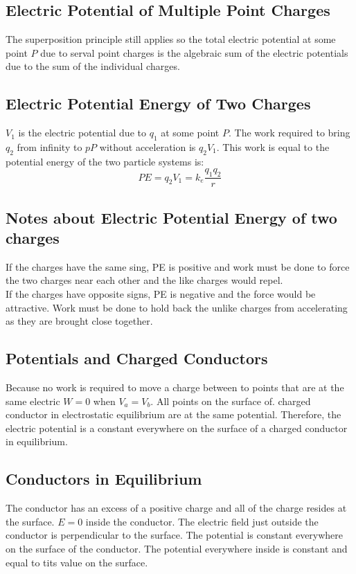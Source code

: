 \subsection{Electric Potential of Multiple Point Charges}
The superposition principle still applies so the total electric potential at some point $P$ due to serval point charges is the algebraic sum of the electric potentials due to the sum of the individual charges.

\subsection{Electric Potential Energy of Two Charges}
$V_1$ is the electric potential due to $q_1$ at some point $P$. The work required to bring $q_2$ from infinity to $pP$ without acceleration is $q_2V_1$. This work is equal to the potential energy of the two particle systems is:
\[PE=q_2V_1=k_e\frac{q_1q_2}{r}\]

\subsection{Notes about Electric Potential Energy of two charges}
If the charges have the same sing, PE is positive and work must be done to force the two charges near each other and the like charges would repel.\\

If the charges have opposite signs, PE is negative and the force would be attractive. Work must be done to hold back the unlike charges from accelerating as they are brought close together. 

\subsection{Potentials and Charged Conductors}
Because no work is required to move a charge between to points that are at the same electric $W=0$ when $V_a=V_b$. All points on the surface of. charged conductor in electrostatic equilibrium are at the same potential. Therefore, the electric potential is a constant everywhere on the surface of a charged conductor in equilibrium.

\subsection{Conductors in Equilibrium}
The conductor has an excess of a positive charge and all of the charge resides at the surface. $E=0$ inside the conductor. The electric field just outside the conductor is perpendicular to the surface. The potential is constant everywhere on the surface of the conductor. The potential everywhere inside is constant and equal to tits value on the surface.

